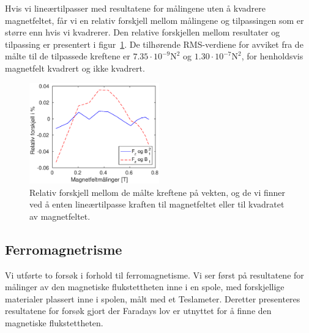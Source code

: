 \documentclass[a4paper,11pt, twocolumn]{article}
\begin{document}
Hvis vi lineærtilpasser med resultatene for målingene uten å kvadrere magnetfeltet, får vi en relativ forskjell mellom målingene og tilpassingen som er større enn hvis vi kvadrerer. Den relative forskjellen mellom resultater og tilpassing er presentert i figur~\ref{fig:relativForskjell}. De tilhørende RMS-verdiene for avviket fra de målte til de tilpassede kreftene er $7.35\cdot 10^{-9}\text{N}^2$ og $1.30\cdot 10^{-7}\text{N}^2$, for henholdsvis magnetfelt kvadrert og ikke kvadrert.

\begin{figure}[!ht]
	\centering
	\includegraphics[width = 0.5\textwidth]{matlab/relativForskjell.eps}
	\caption{Relativ forskjell mellom de målte kreftene på vekten, og de vi finner ved å enten lineærtilpasse kraften til magnetfeltet eller til kvadratet av magnetfeltet.}
	\label{fig:relativForskjell}
\end{figure}
\subsection{Ferromagnetrisme}
Vi utførte to forsøk i forhold til ferromagnetisme. Vi ser først på resultatene for målinger av den magnetiske flukstettheten inne i en spole, med forskjellige materialer plassert inne i spolen, målt med et Teslameter. Deretter presenteres resultatene for forsøk gjort der Faradays lov er utnyttet for å finne den magnetiske flukstettheten.
\end{document}
